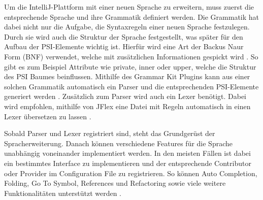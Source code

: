   Um die IntelliJ-Plattform mit einer neuen Sprache zu erweitern, muss zuerst die entsprechende
  Sprache und ihre Grammatik definiert werden. Die Grammatik hat dabei nicht nur die Aufgabe, die 
  Syntaxregeln einer neuen Sprache festzulegen. Durch sie wird auch die Struktur der Sprache festgestellt,
  was später für den Aufbau der PSI-Elemente wichtig ist. Hierfür wird eine Art der Backus Naur Form (BNF)
  verwendet, welche mit zusätzlichen Informationen gespickt wird \cite{mccracken2003backus,GrammarKit}. 
  So gibt es zum Beispiel Attribute
  wie private, inner oder upper, welche die Struktur des PSI Baumes beinflussen. Mithilfe des Grammar Kit Plugins
  kann aus einer solchen Grammatik automatisch ein Parser und die entsprechenden PSI-Elemente generiert werden
  \cite{IntelliJPlatformSDKLanguageTutorialGrammar}. 
  Zusätzlich zum Parser wird auch ein Lexer benötigt. Dabei wird empfohlen, mithilfe von JFlex
  eine Datei mit Regeln automatisch in einen Lexer übersetzen zu lassen 
  \cite{JFlex,KleinJFlexManual,IntelliJPlatformSDKLanguageTutorialLexer}.

  Sobald Parser und Lexer registriert sind, steht das Grundgerüst der Spracherweiterung. Danach können
  verschiedene Features für die Sprache unabhängig voneinander implementiert werden. In den meisten
  Fällen ist dabei ein bestimmtes Interface zu implementieren und der entsprechende Contributor oder
  Provider im Configuration File zu registrieren. So können Auto Completion, Folding, Go To Symbol,
  References und Refactoring sowie viele weitere Funktionalitäten unterstützt werden
  \cite{IntelliJPlatformSDKCustomLanguageSupport,IntelliJPlatformSDKLanguageTutorial}.

